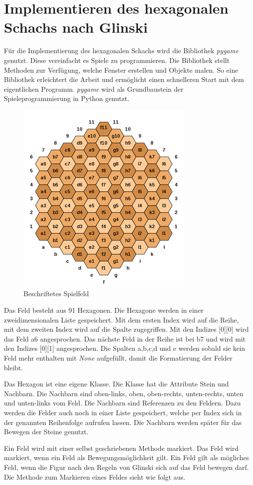 \newcommand{\code}[1]{\texttt{#1}}

\chapter{Implementieren des hexagonalen Schachs nach Glinski}
Für die Implementierung des hexagonalen Schachs wird die Bibliothek \textit{pygame} genutzt. Diese vereinfacht es Spiele zu programmieren. Die Bibliothek stellt Methoden zur Verfügung, welche Fenster erstellen und Objekte malen. So eine Bibliothek erleichtert die Arbeit und ermöglicht einen schnelleren Start mit dem eigentlichen Programm. \textit{pygame} wird als Grundbaustein der Spieleprogrammierung in Python genutzt.

\begin{figure}[H]
    \centering
    \includegraphics{images/hexIndex.png}
    \caption{Beschriftetes Spielfeld \protect\footnotemark}
    \label{fig:hex:index}
\end{figure}

Das Feld besteht aus 91 Hexagonen. Die Hexagone werden in einer zweidimensionalen Liste gespeichert. Mit dem ersten Index wird auf die Reihe, mit dem zweiten Index wird auf die Spalte zugegriffen. Mit den Indizes [0][0] wird das Feld  a6 angesprochen. Das nächste Feld in der Reihe ist bei b7 und wird mit den Indizes [0][1] angesprochen. Die Spalten a,b,c,d und e werden sobald sie kein Feld mehr enthalten mit \textit{None} aufgefüllt, damit die Formatierung der Felder bleibt.\par
Das Hexagon ist eine eigene Klasse. Die Klasse hat die Attribute Stein und Nachbarn. Die Nachbarn sind oben-links, oben, oben-rechts, unten-rechts, unten und unten-links vom Feld. Die Nachbarn sind Referenzen zu den Feldern. Dazu werden die Felder auch noch in einer Liste gespeichert, welche per Index sich in der genannten Reihenfolge aufrufen lassen. Die Nachbarn werden später für das Bewegen der Steine genutzt.\par
Ein Feld wird mit einer selbst geschriebenen Methode markiert. Das Feld wird markiert, wenn ein Feld als Bewegungsmöglichkeit gilt. Ein Feld gilt als mögliches Feld, wenn die Figur nach den Regeln von Glinski sich auf das Feld bewegen darf. Die Methode zum Markieren eines Feldes sieht wie folgt aus.

